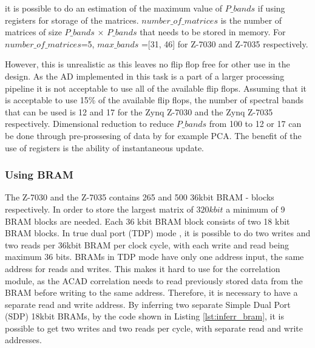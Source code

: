 it is possible to do an estimation of the maximum value of $P\_bands$ if using registers for storage of the matrices. $number\_of\_matrices$ is the number of matrices of size $P\_bands$ $\times$ $P\_bands$ that needs to be stored in memory. For $number\_of\_matrices$=5, $max\_bands$ =[31, 46] for Z-7030 and Z-7035 respectively.


However, this is unrealistic as this leaves no flip flop free for other use in the design. As the AD implemented in this task is a part of a larger processing pipeline it is not acceptable to use all of the available flip flops. Assuming that it is acceptable to use 15\% of the available flip flops, the number of spectral bands that can be used is 12 and 17 for the Zynq Z-7030 and the Zynq Z-7035 respectively. Dimensional reduction to reduce $P\_bands$ from 100 to 12 or 17 can be done through pre-prossesing of data by for example PCA.
The benefit of the use of registers is the ability of instantaneous update. %



\subsubsection{Using BRAM}
The Z-7030 and the Z-7035 contains 265 and 500 $36$kbit BRAM - blocks respectively. In  order to store the largest matrix of $320 kbit$ a minimum of 9 BRAM blocks are needed. Each 36 kbit BRAM block consists of two 18 kbit BRAM blocks. In true dual port (TDP) mode \cite{cite:ug953}, it is possible to do two writes and two reads per 36kbit BRAM per clock cycle, with each write and read being maximum 36 bits. BRAMs in TDP mode have only one address input, the same address for reads and writes. This makes it hard to use for the correlation module, as the ACAD correlation needs to read previously stored data from the BRAM before writing to the same address. Therefore, it is necessary to have a separate read and write address. By inferring two separate Simple Dual Port (SDP) 18kbit BRAMs, by the code shown in Listing \ref{lst:inferr_bram}, it is possible to get two writes and two reads per cycle, with separate read and write addresses.









